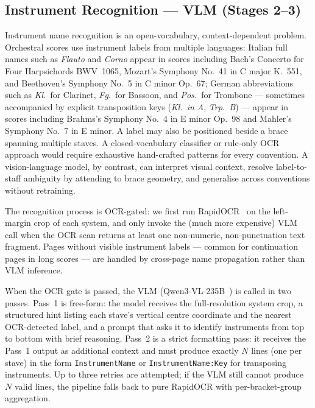 \documentclass[11pt,a4paper]{article}
\begin{document}
\subsection{Instrument Recognition --- VLM (Stages 2--3)}

Instrument name recognition is an open-vocabulary, context-dependent problem.
Orchestral scores use instrument labels from multiple languages: Italian full names such as \textit{Flauto} and \textit{Corno} appear in scores including Bach's Concerto for Four Harpsichords BWV~1065, Mozart's Symphony No.~41 in C major K.~551, and Beethoven's Symphony No.~5 in C minor Op.~67; German abbreviations such as \textit{Kl.}\ for Clarinet, \textit{Fg.}\ for Bassoon, and \textit{Pos.}\ for Trombone — sometimes accompanied by explicit transposition keys (\textit{Kl.\ in A}, \textit{Trp.\ B}) — appear in scores including Brahms's Symphony No.~4 in E minor Op.~98 and Mahler's Symphony No.~7 in E minor.
A label may also be positioned beside a brace spanning multiple staves.
A closed-vocabulary classifier or rule-only OCR approach would require exhaustive hand-crafted patterns for every convention.
A vision-language model, by contrast, can interpret visual context, resolve label-to-staff ambiguity by attending to brace geometry, and generalise across conventions without retraining.

The recognition process is OCR-gated: we first run RapidOCR~\cite{rapidocr} on the left-margin crop of each system, and only invoke the (much more expensive) VLM call when the OCR scan returns at least one non-numeric, non-punctuation text fragment.
Pages without visible instrument labels — common for continuation pages in long scores — are handled by cross-page name propagation rather than VLM inference.

When the OCR gate is passed, the VLM (Qwen3-VL-235B~\cite{qwen3vl}) is called in two passes.
Pass~1 is free-form: the model receives the full-resolution system crop, a structured hint listing each stave's vertical centre coordinate and the nearest OCR-detected label, and a prompt that asks it to identify instruments from top to bottom with brief reasoning.
Pass~2 is a strict formatting pass: it receives the Pass~1 output as additional context and must produce exactly $N$ lines (one per stave) in the form \texttt{InstrumentName} or \texttt{InstrumentName:Key} for transposing instruments.
Up to three retries are attempted; if the VLM still cannot produce $N$ valid lines, the pipeline falls back to pure RapidOCR with per-bracket-group aggregation.
\end{document}
